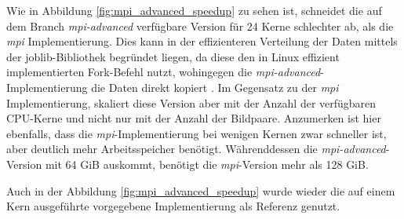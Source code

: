Wie in Abbildung \ref{fig:mpi_advanced_speedup} zu sehen ist, schneidet die auf dem Branch \textit{mpi-advanced} \cite{Coj17} verfügbare Version für 24 Kerne schlechter ab, als die \textit{mpi} Implementierung. Dies kann in der effizienteren Verteilung der Daten mittels der joblib-Bibliothek begründet liegen, da diese den in Linux effizient implementierten Fork-Befehl nutzt, wohingegen die \textit{mpi-advanced}-Implementierung die Daten direkt kopiert \cite{GVB+18}. Im Gegensatz zu der \textit{mpi} Implementierung, skaliert diese Version aber mit der Anzahl der verfügbaren \gls{CPU}-Kerne und nicht nur mit der Anzahl der Bildpaare. Anzumerken ist hier ebenfalls, dass die \textit{mpi}-Implementierung bei wenigen Kernen zwar schneller ist, aber deutlich mehr Arbeitsspeicher benötigt. Währenddessen die \textit{mpi-advanced}-Version mit 64 \gls{GiB} auskommt, benötigt die \textit{mpi}-Version mehr als 128 \gls{GiB}.

Auch in der Abbildung \ref{fig:mpi_advanced_speedup} wurde wieder die auf einem Kern ausgeführte vorgegebene Implementierung als Referenz genutzt. 


